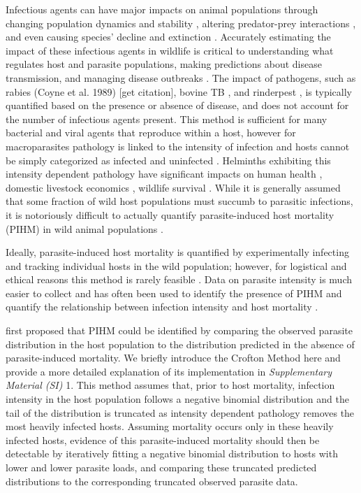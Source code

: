 \documentclass[12pt, a4paper]{article}
\begin{document}
Infectious agents can have major impacts on animal populations through changing
population dynamics and stability \citep{Dobson1992}, altering predator-prey interactions \citep{Joly2004}, and
even causing species' decline and extinction \citep{DeCastro2005a,McCallum2012b}. Accurately estimating the impact
of these infectious agents in wildlife is critical to understanding what
regulates host and parasite populations, making predictions about disease
transmission, and managing disease outbreaks \citep{Langwig2015}. The impact of pathogens, such as rabies (Coyne et al. 1989) [get citation], bovine TB \citep{Cox2005}, and
rinderpest \citep{Tille1991}, is typically quantified based on the presence or absence of
disease, and does not account for the number of infectious agents present.
This method is sufficient for many bacterial and viral agents that reproduce within a
host, however for macroparasites pathology is linked to the intensity of infection and hosts cannot be simply categorized as infected and
uninfected \citep{AndersonandMay1979,Lafferty2002}.  Helminths exhibiting this intensity dependent pathology have
significant impacts on human health \citep{Brooker2004}, domestic livestock economics \citep{Roeber2013},
wildlife survival \citep{Kirk2003, Logiudice2003}.  While it is generally assumed that some fraction of
wild host populations must succumb to parasitic infections, it is notoriously
difficult to actually quantify parasite-induced host mortality (PIHM) in wild
animal populations \citep{McCallum2000a}.

Ideally, parasite-induced host mortality is
quantified by experimentally infecting and tracking individual hosts in the
wild population; however, for logistical and ethical reasons this method is
rarely feasible \citep{McCallum2000a}. Data on parasite intensity is much easier to collect and has
often been used to identify the presence of PIHM \citep{Crofton1971a,Lester1977,Lester1984,Lanciani1989,Royce1990,Ferguson2011} and quantify the
relationship between infection intensity and host mortality \citep{Adjei1986}.

\cite{Crofton1971a} first proposed that PIHM could be identified by comparing the
observed parasite distribution in the host population to the distribution
predicted in the absence of parasite-induced mortality. We briefly introduce the Crofton Method here and provide a more detailed explanation of its implementation in \emph{Supplementary Material (SI)} 1. This method
assumes that, prior to host mortality, infection intensity in the host population follows a negative binomial distribution and the tail of the distribution is truncated as intensity dependent pathology removes the most heavily infected hosts. Assuming mortality occurs only in these heavily infected hosts, evidence of this parasite-induced mortality should then be detectable by iteratively
fitting a negative binomial distribution to hosts with lower and lower parasite
loads, and comparing these truncated predicted distributions to the corresponding truncated observed parasite data.
\end{document}

